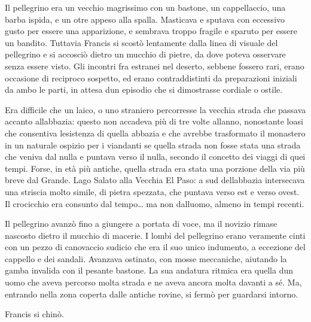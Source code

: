 Il pellegrino era un vecchio magrissimo con un bastone, un cappellaccio,
una barba ispida, e un otre appeso alla spalla. Masticava e sputava con
eccessivo gusto per essere una apparizione, e sembrava troppo fragile e
sparuto per essere un bandito. Tuttavia Francis si scostò lentamente
dalla linea di visuale del pellegrino e si accosciò dietro un mucchio di
pietre, da dove poteva osservare senza essere visto. Gli incontri fra
estranei nel deserto, sebbene fossero rari, erano occasione di reciproco
sospetto, ed erano contraddistinti da preparazioni iniziali da ambo le
parti, in attesa d\textquotesingle un episodio che si dimostrasse
cordiale o ostile.

Era difficile che un laico, o uno straniero percorresse la vecchia
strada che passava accanto all\textquotesingle abbazia: questo non
accadeva più di tre volte all\textquotesingle anno, nonostante
l\textquotesingle oasi che consentiva l\textquotesingle esistenza di
quella abbazia e che avrebbe trasformato il monastero in un naturale
ospizio per i viandanti se quella strada non fosse stata una strada che
veniva dal nulla e puntava verso il nulla, secondo il concetto dei
viaggi di quei tempi. Forse, in età più antiche, quella strada era stata
una porzione della via più breve dal Grande. Lago Salato alla Vecchia El
Paso: a sud dell\textquotesingle abbazia intersecava una striscia molto
simile, di pietra spezzata, che puntava verso est e verso ovest. Il
crocicchio era consunto dal tempo\ldots{} ma non
dall\textquotesingle uomo, almeno in tempi recenti.

Il pellegrino avanzò fino a giungere a portata di voce, ma il novizio
rimase nascosto dietro il mucchio di macerie. I lombi del pellegrino
erano veramente cinti con un pezzo di canovaccio sudicio che era il suo
unico indumento, a eccezione del cappello e dei sandali. Avanzava
ostinato, con mosse meccaniche, aiutando la gamba invalida con il
pesante bastone. La sua andatura ritmica era quella d\textquotesingle un
uomo che aveva percorso molta strada e ne aveva ancora molta davanti a
sé. Ma, entrando nella zona coperta dalle antiche rovine, si fermò per
guardarsi intorno.

Francis si chinò.

